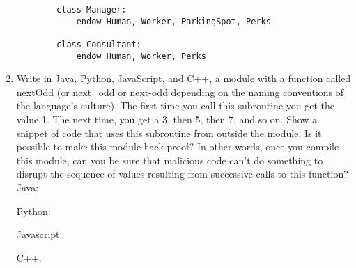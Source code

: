\documentclass{article}
\begin{document}
\begin{enumerate}
\begin{verbatim}
        class Manager:
            endow Human, Worker, ParkingSpot, Perks

        class Consultant:
            endow Human, Worker, Perks
    \end{verbatim}
    \pagebreak
    \item Write in Java, Python, JavaScript, and C++, a module with a function called nextOdd (or next\_odd or next-odd depending on the naming conventions of the language's culture). The first time you call this subroutine you get the value 1. The next time, you get a 3, then 5, then 7, and so on. Show a snippet of code that uses this subroutine from outside the module. Is it possible to make this module hack-proof? In other words, once you compile this module, can you be sure that malicious code can't do something to disrupt the sequence of values resulting from successive calls to this function? \\
    \linebreak
    Java:
    
    Python:
    
    Javascript:
    
    C++:
    
\end{enumerate}
\end{document}
